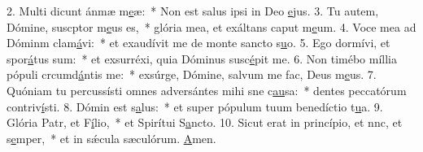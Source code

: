 2. Multi dicunt ánmæ m\uline{e}æ:~* Non est salus ipsi in Deo \uline{e}jus.
3. Tu autem, Dómine, suscptor m\uline{e}us es,~* glória mea, et exáltans caput m\uline{e}um.
4. Voce mea ad Dóminm clam\uline{á}vi:~* et exaudívit me de monte sancto s\uline{u}o.
5. Ego dormívi, et spor\uline{á}tus sum:~* et exsurréxi, quia Dóminus susc\uline{é}pit me.
6. Non timébo míllia pópuli crcumd\uline{á}ntis me:~* exsúrge, Dómine, salvum me fac, Deus m\uline{e}us.
7. Quóniam tu percussísti omnes adversántes mihi sne c\uline{au}sa:~* dentes peccatórum contriv\uline{í}sti.
8. Dómin est s\uline{a}lus:~* et super pópulum tuum benedíctio t\uline{u}a.
9. Glória Patr, et F\uline{í}lio,~* et Spirítui S\uline{a}ncto.
10. Sicut erat in princípio, et nnc, et s\uline{e}mper,~* et in sǽcula sæculórum. \uline{A}men.
